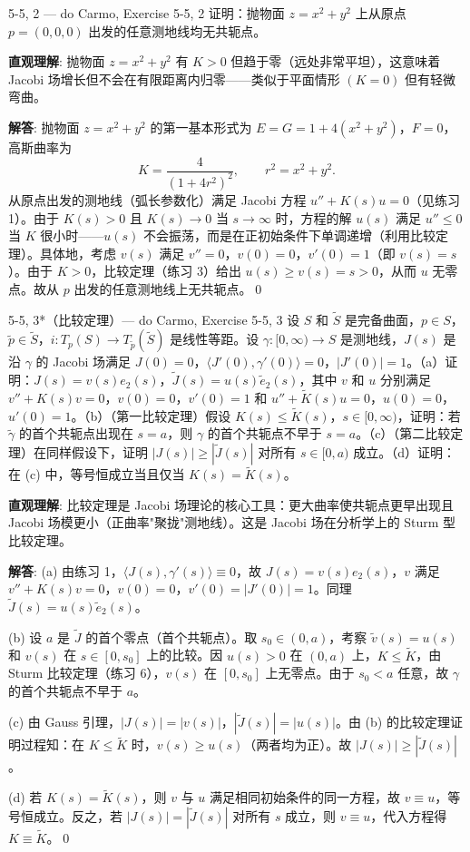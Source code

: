 \begin{exercise}{5-5, 2 — do Carmo, Exercise 5-5, 2}
证明：抛物面 $z=x^2+y^2$ 上从原点 $p=(0,0,0)$ 出发的任意测地线均无共轭点。
\end{exercise}
\begin{solution}
\textbf{直观理解}: 抛物面 $z=x^2+y^2$ 有 $K>0$ 但趋于零（远处非常平坦），这意味着 Jacobi 场增长但不会在有限距离内归零——类似于平面情形 $(K=0)$ 但有轻微弯曲。

\textbf{解答}: 抛物面 $z=x^2+y^2$ 的第一基本形式为 $E=G=1+4(x^2+y^2)$，$F=0$，高斯曲率为
\[
K = \frac{4}{(1+4r^2)^2},\qquad r^2=x^2+y^2.
\]
从原点出发的测地线（弧长参数化）满足 Jacobi 方程 $u''+K(s)u=0$（见练习 1）。由于 $K(s)>0$ 且 $K(s)\to 0$ 当 $s\to\infty$ 时，方程的解 $u(s)$ 满足 $u''\leq 0$ 当 $K$ 很小时——$u(s)$ 不会振荡，而是在正初始条件下单调递增（利用比较定理）。具体地，考虑 $v(s)$ 满足 $v''=0$，$v(0)=0$，$v'(0)=1$（即 $v(s)=s$）。由于 $K>0$，比较定理（练习 3）给出 $u(s)\geq v(s)=s>0$，从而 $u$ 无零点。故从 $p$ 出发的任意测地线上无共轭点。\qed
\end{solution}

\begin{exercise}{5-5, 3*（比较定理）— do Carmo, Exercise 5-5, 3}
设 $S$ 和 $\tilde{S}$ 是完备曲面，$p\in S$，$\tilde{p}\in\tilde{S}$，$i: T_p(S) \to T_{\tilde{p}}(\tilde{S})$ 是线性等距。设 $\gamma: [0,\infty) \to S$ 是测地线，$J(s)$ 是沿 $\gamma$ 的 Jacobi 场满足 $J(0)=0$，$\langle J'(0),\gamma'(0)\rangle=0$，$|J'(0)|=1$。（a）证明：$J(s)=v(s)e_2(s)$，$\tilde{J}(s)=u(s)\tilde{e}_2(s)$，其中 $v$ 和 $u$ 分别满足 $v''+K(s)v=0$，$v(0)=0$，$v'(0)=1$ 和 $u''+\tilde{K}(s)u=0$，$u(0)=0$，$u'(0)=1$。（b）（第一比较定理）假设 $K(s)\leq \tilde{K}(s)$，$s\in[0,\infty)$，证明：若 $\tilde{\gamma}$ 的首个共轭点出现在 $s=a$，则 $\gamma$ 的首个共轭点不早于 $s=a$。（c）（第二比较定理）在同样假设下，证明 $|J(s)| \geq |\tilde{J}(s)|$ 对所有 $s\in[0,a)$ 成立。（d）证明：在 (c) 中，等号恒成立当且仅当 $K(s)=\tilde{K}(s)$。
\end{exercise}
\begin{solution}
\textbf{直观理解}: 比较定理是 Jacobi 场理论的核心工具：更大曲率使共轭点更早出现且 Jacobi 场模更小（正曲率"聚拢"测地线）。这是 Jacobi 场在分析学上的 Sturm 型比较定理。

\textbf{解答}: (a) 由练习 1，$\langle J(s),\gamma'(s)\rangle\equiv 0$，故 $J(s)=v(s)e_2(s)$，$v$ 满足 $v''+K(s)v=0$，$v(0)=0$，$v'(0)=|J'(0)|=1$。同理 $\tilde{J}(s)=u(s)\tilde{e}_2(s)$。

(b) 设 $a$ 是 $\tilde{J}$ 的首个零点（首个共轭点）。取 $s_0\in(0,a)$，考察 $\tilde{v}(s)=u(s)$ 和 $v(s)$ 在 $s\in[0,s_0]$ 上的比较。因 $u(s)>0$ 在 $(0,a)$ 上，$K\leq\tilde{K}$，由 Sturm 比较定理（练习 6），$v(s)$ 在 $[0,s_0]$ 上无零点。由于 $s_0<a$ 任意，故 $\gamma$ 的首个共轭点不早于 $a$。

(c) 由 Gauss 引理，$|J(s)|=|v(s)|$，$|\tilde{J}(s)|=|u(s)|$。由 (b) 的比较定理证明过程知：在 $K\leq\tilde{K}$ 时，$v(s)\geq u(s)$（两者均为正）。故 $|J(s)|\geq|\tilde{J}(s)|$。

(d) 若 $K(s)=\tilde{K}(s)$，则 $v$ 与 $u$ 满足相同初始条件的同一方程，故 $v\equiv u$，等号恒成立。反之，若 $|J(s)|=|\tilde{J}(s)|$ 对所有 $s$ 成立，则 $v\equiv u$，代入方程得 $K\equiv\tilde{K}$。\qed
\end{solution}

